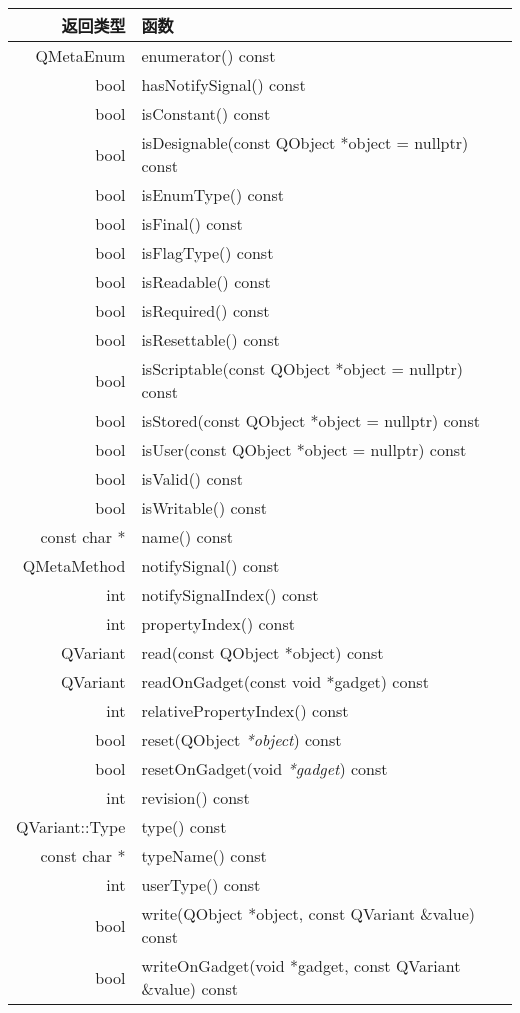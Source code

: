 \begin{longtable}{|r|m{28em}|}   
\hline
返回类型 	& 函数 \\
\hline
QMetaEnum &	enumerator() const \\
\hline 
bool &	hasNotifySignal() const \\ 
\hline
bool &	isConstant() const \\ 
\hline
bool &	isDesignable(const QObject *object = nullptr) const \\
\hline
bool &	isEnumType() const \\
\hline
bool 	&isFinal() const \\ 
\hline
bool 	&isFlagType() const \\ 
\hline
bool &	isReadable() const \\ 
\hline
bool &	isRequired() const\\
\hline
bool &	isResettable() const\\
\hline
bool &	isScriptable(const QObject *object = nullptr) const\\
\hline
bool 	&isStored(const QObject *object = nullptr) const\\
\hline
bool 	&isUser(const QObject *object = nullptr) const\\
\hline
bool &	isValid() const\\
\hline
bool 	&isWritable() const\\
\hline
const char * &	name() const\\
\hline
QMetaMethod &	notifySignal() const\\
\hline
int 	& notifySignalIndex() const\\
\hline
int  &	propertyIndex() const\\
\hline
QVariant &	read(const QObject *object) const \\
\hline
QVariant 	&readOnGadget(const void *gadget) const \\
\hline
int 	&relativePropertyIndex() const\\
\hline
bool &	reset(QObject \emph{*object}) const\\
\hline
bool 	&resetOnGadget(void \emph{*gadget}) const \\
\hline
int 	&revision() const\\
\hline
QVariant::Type &	type() const \\
\hline
const char * &	typeName() const \\ 
\hline
int 	& userType() const \\ 
\hline
bool &	write(QObject *object, const QVariant \&value) const \\ 
\hline
bool 	&writeOnGadget(void *gadget, const QVariant \&value) const \\ 
\hline
\end{longtable}



